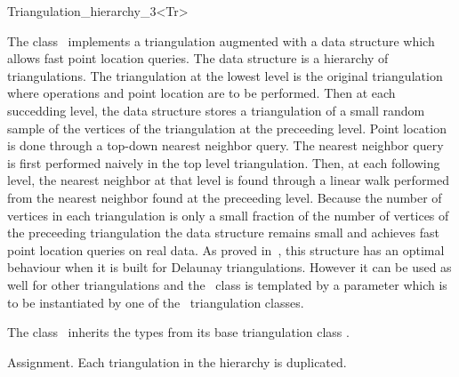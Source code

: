 

\begin{ccRefClass}{Triangulation_hierarchy_3<Tr>}

\ccDefinition
The class \ccRefName\ implements a triangulation augmented with
a data structure which allows fast point location queries.
The data structure is a hierarchy 
of triangulations. The triangulation at the lowest level is
the original triangulation where operations and point location are to 
be performed.
Then at each succedding level, the data structure
stores a triangulation of a small random sample of the vertices
of the triangulation at the preceeding level. Point location
is done through a top-down nearest neighbor query.
The nearest neighbor query is first
performed naively in the top level triangulation.
Then, at each following level, the nearest neighbor at that level
is found through a linear walk performed from
the nearest neighbor found at the preceeding level.
Because the number of vertices in each triangulation is only a small
fraction of the number of vertices of the preceeding triangulation 
the data structure remains small and achieves fast point location 
queries on real
data. As proved in~\cite{d-iirdt-98}, this structure has an optimal behaviour
when it is built for Delaunay triangulations.
However it can be used as well for other triangulations
and the \ccRefName\ class is templated by a parameter
which is to be instantiated by one of the \cgal\ triangulation
classes.


\ccInheritsFrom


\ccTypes
The class \ccRefName\ inherits the types from its base triangulation
class .

\ccCreation
{}  %

\ccGlue
{}
\ccGlue
{}
{Assignment. Each triangulation in the hierarchy is duplicated.}


\end{ccRefClass}
